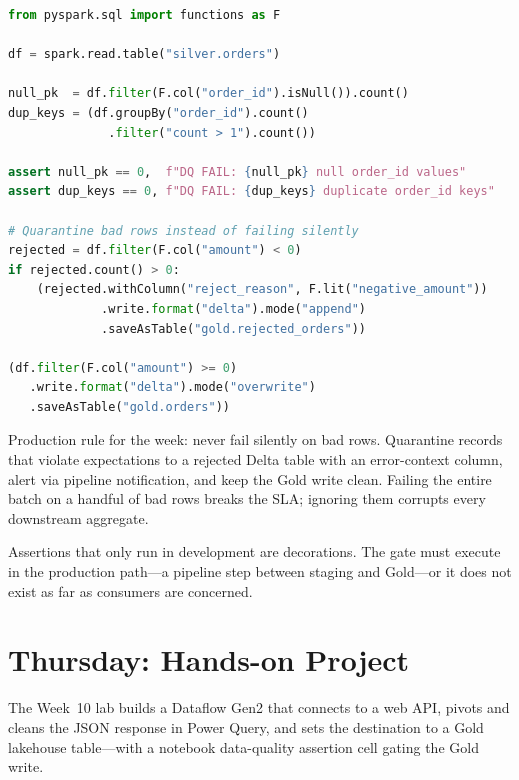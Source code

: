 \begin{lstlisting}[language=Python,caption={Data-quality assertions gating the Gold write, with quarantine.},label={lst:chapter10-dq-gate}]
from pyspark.sql import functions as F

df = spark.read.table("silver.orders")

null_pk  = df.filter(F.col("order_id").isNull()).count()
dup_keys = (df.groupBy("order_id").count()
              .filter("count > 1").count())

assert null_pk == 0,  f"DQ FAIL: {null_pk} null order_id values"
assert dup_keys == 0, f"DQ FAIL: {dup_keys} duplicate order_id keys"

# Quarantine bad rows instead of failing silently
rejected = df.filter(F.col("amount") < 0)
if rejected.count() > 0:
    (rejected.withColumn("reject_reason", F.lit("negative_amount"))
             .write.format("delta").mode("append")
             .saveAsTable("gold.rejected_orders"))

(df.filter(F.col("amount") >= 0)
   .write.format("delta").mode("overwrite")
   .saveAsTable("gold.orders"))
\end{lstlisting}

\begin{notebox}
Production rule for the week: never fail silently on bad rows. Quarantine records that violate expectations to a rejected Delta table with an error-context column, alert via pipeline notification, and keep the Gold write clean. Failing the entire batch on a handful of bad rows breaks the SLA; ignoring them corrupts every downstream aggregate.
\end{notebox}

\begin{pitfall}
Assertions that only run in development are decorations. The gate must execute in the production path---a pipeline step between staging and Gold---or it does not exist as far as consumers are concerned.
\end{pitfall}

\section{Thursday: Hands-on Project}
The Week~10 lab builds a Dataflow Gen2 that connects to a web API, pivots and cleans the JSON response in Power Query, and sets the destination to a Gold lakehouse table---with a notebook data-quality assertion cell gating the Gold write.


